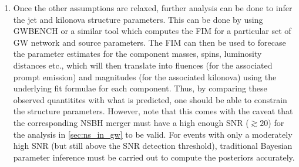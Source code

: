 \begin{enumerate}
            \item Once the other assumptions are relaxed, further analysis can be done
                to infer the jet and kilonova structure parameters. This can be done by
                using GWBENCH or a similar tool which computes the FIM for a particular
                set of GW network and source parameters. The FIM can then be used to
                forecase the parameter estimates for the component masses, spins,
                luminosity distances etc., which will then translate into fluences (for
                the associated prompt emission) and magnitudes (for the associated
                kilonova) using the underlying fit formulae for each component. Thus, by
                comparing these observed quantitites with what is predicted, one should
                be able to constrain the structure parameters. However, note that this
                comes with the caveat that the corresponding NSBH merger must have a
                high enough SNR ($\gtrsim 20$) for the analysis in \ref{sec:ns_in_gw} to
                be valid. For events with only a moderately high SNR (but still above
                the SNR detection threshold), traditional Bayesian parameter inference
                must be carried out to compute the posteriors accurately.

        \end{enumerate}
